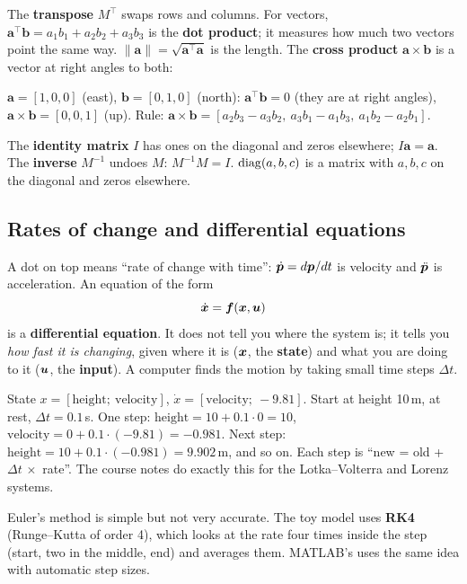 The \textbf{transpose} $M^\top$ swaps rows and columns. For vectors, $\bm a^\top\bm b=a_1b_1+a_2b_2+a_3b_3$ is the
\textbf{dot product}; it measures how much two vectors point the same way. $\|\bm a\|=\sqrt{\bm a^\top\bm a}$ is the length.
The \textbf{cross product} $\bm a\times\bm b$ is a vector at right angles to both:
\begin{toy}
$\bm a=[1,0,0]$ (east), $\bm b=[0,1,0]$ (north): $\bm a^\top\bm b=0$ (they are at right angles),
$\bm a\times\bm b=[0,0,1]$ (up). Rule: $\bm a\times\bm b=[a_2b_3-a_3b_2,\ a_3b_1-a_1b_3,\ a_1b_2-a_2b_1]$.
\end{toy}

The \textbf{identity matrix} $I$ has ones on the diagonal and zeros elsewhere; $I\bm a=\bm a$. The \textbf{inverse}
$M^{-1}$ undoes $M$: $M^{-1}M=I$. $\operatorname{diag}(a,b,c)$ is a matrix with $a,b,c$ on the diagonal and zeros elsewhere.

\subsection{Rates of change and differential equations}

A dot on top means ``rate of change with time'': $\dot{\bm{p}}=d\bm{p}/dt$ is velocity and $\ddot{\bm{p}}$ is acceleration.
An equation of the form
\[
\dot{\bm{x}}=\bm{f}(\bm{x},\bm{u})
\]
is a \textbf{differential equation}. It does not tell you where the system is; it tells you \emph{how fast it is
changing}, given where it is ($\bm{x}$, the \textbf{state}) and what you are doing to it ($\bm{u}$, the \textbf{input}).
A computer finds the motion by taking small time steps $\Delta t$.
\begin{toy}
State $x=[\text{height};\ \text{velocity}]$, $\dot x=[\text{velocity};\ -9.81]$. Start at height 10\,m, at rest,
$\Delta t=0.1$\,s. One step: $\text{height}=10+0.1\cdot0=10$, $\text{velocity}=0+0.1\cdot(-9.81)=-0.981$.
Next step: $\text{height}=10+0.1\cdot(-0.981)=9.902$\,m, and so on. Each step is ``new = old + $\Delta t\,\times$ rate''.
The course notes do exactly this for the Lotka--Volterra and Lorenz systems.
\end{toy}

Euler's method is simple but not very accurate. The toy model uses \textbf{RK4} (Runge--Kutta of order 4), which
looks at the rate four times inside the step (start, two in the middle, end) and averages them. MATLAB's 
uses the same idea with automatic step sizes.

